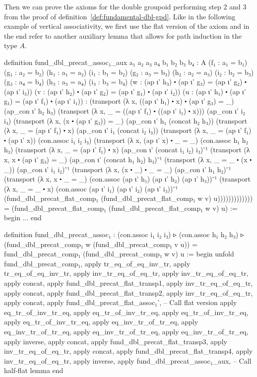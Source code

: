 Then we can prove the axioms for the double groupoid performing step 2 and 3
from the proof of definition~\ref{def:fundamental-dbl-gpd}.
Like in the following example of vertical associativity, we first use the flat
version of the axiom and in the end refer to another auxiliary lemma that allows
for path induction in the type $A$.
\begin{leancodebr}
  definition fund_dbl_precat_assoc₁_aux {a₁ a₂ a₃ a₄ b₁ b₂ b₃ b₄ : A}
    (f₁ : a₁ = b₁) (g₁ : a₂ = b₂) (h₁ : a₁ = a₂) (i₁ : b₁ = b₂)
    (g₂ : a₃ = b₃) (h₂ : a₂ = a₃) (i₂ : b₂ = b₃) (g₃ : a₄ = b₄)
    (h₃ : a₃ = a₄) (i₃ : b₃ = b₄)
    (w : (ap ι' h₃) ⬝ (ap ι' g₃) = (ap ι' g₂) ⬝ (ap ι' i₃))
    (v : (ap ι' h₂) ⬝ (ap ι' g₂) = (ap ι' g₁) ⬝ (ap ι' i₂))
    (u : (ap ι' h₁) ⬝ (ap ι' g₁) = (ap ι' f₁) ⬝ (ap ι' i₁)) :
    (transport (λ x, ((ap ι' h₁) ⬝ x) ⬝ (ap ι' g₃) = _) (ap_con ι' h₂ h₃)
     (transport (λ x, _ =  ((ap ι' f₁) ⬝ ((ap ι' i₁) ⬝ x))) (ap_con ι' i₂ i₃)
      (transport (λ x, (x ⬝ (ap ι' g₃)) = _) (ap_con ι' h₁ (concat h₂ h₃))
       (transport (λ x, _ = (ap ι' f₁) ⬝ x) (ap_con ι' i₁ (concat i₂ i₃))
        (transport (λ x, _ = (ap ι' f₁) ⬝ (ap ι' x)) (con.assoc i₁ i₂ i₃)
         (transport (λ x, (ap ι' x) ⬝ _ = _) (con.assoc h₁ h₂ h₃)
          (transport (λ x, _ =  (ap ι' f₁) ⬝ x) (ap_con ι' (concat i₁ i₂) i₃)⁻¹
           (transport (λ x, x ⬝ (ap ι' g₃) = _) (ap_con ι' (concat h₁ h₂) h₃)⁻¹
            (transport (λ x, _ = _ ⬝ (x ⬝ _)) (ap_con ι' i₁ i₂)⁻¹
             (transport (λ x, (x ⬝ _) ⬝ _ = _) (ap_con ι' h₁ h₂)⁻¹
              (transport (λ x, x ⬝ _ = _)
                (con.assoc (ap ι' h₁) (ap ι' h₂) (ap ι' h₃))⁻¹
                (transport (λ x, _ = _ ⬝ x)
                   (con.assoc (ap ι' i₁) (ap ι' i₂) (ap ι' i₃))⁻¹
                   (fund_dbl_precat_flat_comp₁
                     (fund_dbl_precat_flat_comp₁ w v) u)))))))))))))
     = (fund_dbl_precat_flat_comp₁ (fund_dbl_precat_flat_comp₁ w v) u) :=
  begin
    ...
  end

  definition fund_dbl_precat_assoc₁ :
    (con.assoc i₁ i₂ i₃) ▹ (con.assoc h₁ h₂ h₃) ▹
      (fund_dbl_precat_comp₁ w (fund_dbl_precat_comp₁ v u))
    = fund_dbl_precat_comp₁ (fund_dbl_precat_comp₁ w v) u :=
  begin
    unfold fund_dbl_precat_comp₁,
    apply tr_eq_of_eq_inv_tr, apply tr_eq_of_eq_inv_tr,
    apply inv_tr_eq_of_eq_tr, apply inv_tr_eq_of_eq_tr,
    apply concat, apply fund_dbl_precat_flat_transp1, apply inv_tr_eq_of_eq_tr,
    apply concat, apply fund_dbl_precat_flat_transp2, apply inv_tr_eq_of_eq_tr,
    apply concat, apply fund_dbl_precat_flat_assoc₁', -- Call flat version
    apply eq_tr_of_inv_tr_eq, apply eq_tr_of_inv_tr_eq,
    apply eq_tr_of_inv_tr_eq, apply eq_tr_of_inv_tr_eq,
    apply eq_inv_tr_of_tr_eq, apply eq_inv_tr_of_tr_eq,
    apply eq_inv_tr_of_tr_eq, apply eq_inv_tr_of_tr_eq,
    apply inverse,
    apply concat, apply fund_dbl_precat_flat_transp3, apply inv_tr_eq_of_eq_tr,
    apply concat, apply fund_dbl_precat_flat_transp4, apply inv_tr_eq_of_eq_tr,
    apply inverse, apply fund_dbl_precat_assoc₁_aux, -- Call half-flat lemma
  end
\end{leancodebr}

